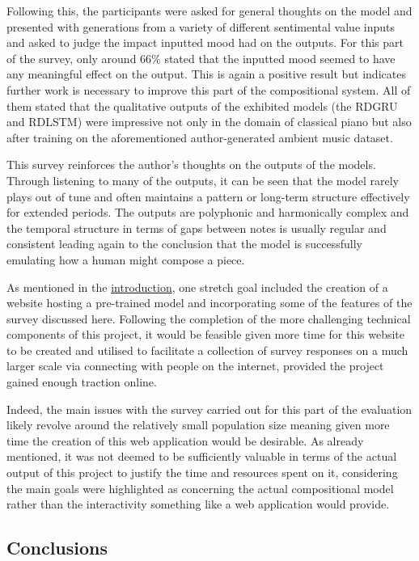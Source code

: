 \documentclass[12pt,]{article}
\begin{document}
Following this, the participants were asked for general thoughts on the
model and presented with generations from a variety of different
sentimental value inputs and asked to judge the impact inputted mood had
on the outputs. For this part of the survey, only around 66\% stated
that the inputted mood seemed to have any meaningful effect on the
output. This is again a positive result but indicates further work is
necessary to improve this part of the compositional system. All of them
stated that the qualitative outputs of the exhibited models (the RDGRU
and RDLSTM) were impressive not only in the domain of classical piano
but also after training on the aforementioned author-generated ambient
music dataset.

This survey reinforces the author's thoughts on the outputs of the
models. Through listening to many of the outputs, it can be seen that
the model rarely plays out of tune and often maintains a pattern or
long-term structure effectively for extended periods. The outputs are
polyphonic and harmonically complex and the temporal structure in terms
of gaps between notes is usually regular and consistent leading again to
the conclusion that the model is successfully emulating how a human
might compose a piece.

As mentioned in the \protect\hyperlink{introduction}{introduction}, one
stretch goal included the creation of a website hosting a pre-trained
model and incorporating some of the features of the survey discussed
here. Following the completion of the more challenging technical
components of this project, it would be feasible given more time for
this website to be created and utilised to facilitate a collection of
survey responses on a much larger scale via connecting with people on
the internet, provided the project gained enough traction online.

Indeed, the main issues with the survey carried out for this part of the
evaluation likely revolve around the relatively small population size
meaning given more time the creation of this web application would be
desirable. As already mentioned, it was not deemed to be sufficiently
valuable in terms of the actual output of this project to justify the
time and resources spent on it, considering the main goals were
highlighted as concerning the actual compositional model rather than the
interactivity something like a web application would provide.

\hypertarget{conclusions}{%
\subsection{Conclusions}\label{conclusions}}
\end{document}
